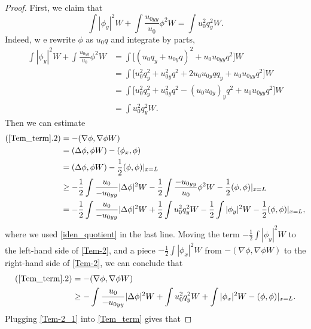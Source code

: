 \documentclass[reqno, 11pt]{amsart}
\theoremstyle{plain}
\theoremstyle{definition}
\theoremstyle{remark}
\numberwithin{equation}{section}
\begin{document}
\begin{proof}
First, we claim that
\begin{equation}\label{iden_quotient}
\int |\phi_y|^2 W + \int \frac{u_{0yy}}{u_0} \phi^2 W = \int u_0^2 q_y^2 W.
\end{equation}
Indeed, w e rewrite $\phi$ as $u_0 q$ and integrate by parts,
\begin{align*}
\int |\phi_y|^2 W + \int \frac{u_{0yy}}{u_0} \phi^2 W &= \int \Big[ (u_0 q_y + u_{0y}q)^2 + u_0 u_{0yy} q^2 \Big] W\\
&= \int \Big[ u_0^2 q_y^2 + u_{0y}^2q^2 + 2 u_0 u_{0y} q q_y + u_0 u_{0yy} q^2 \Big] W\\
&= \int \Big[ u_0^2 q_y^2 + u_{0y}^2q^2 - (u_0 u_{0y})_y q^2 + u_0 u_{0yy} q^2 \Big] W\\
&= \int u_0^2 q_y^2 W.
\end{align*}
Then we can estimate
\begin{equation}\label{Tem-2}
\begin{aligned}
 (\ref{Tem_term}.2) &= -  (\nabla \phi, \nabla \phi W) \\ &=  (\Delta \phi, \phi W)-  (\phi_x, \phi)\\
 &=  (\Delta \phi, \phi W) - \frac{1}{2} (\phi ,\phi)|_{x=L}\\
 & \ge - \frac{1}{2} \int \frac{u_0}{-u_{0yy}} |\Delta \phi|^2 W - \frac{1}{2} \int \frac{-u_{0yy}}{u_0} \phi^2 W - \frac{1}{2} (\phi ,\phi)|_{x=L}\\
 &= - \frac{1}{2} \int \frac{u_0}{-u_{0yy}} |\Delta \phi|^2 W + \frac{1}{2} \int u_0^2 q_y^2 W - \frac{1}{2} \int |\phi_y|^2 W - \frac{1}{2} (\phi ,\phi)|_{x=L},\\
\end{aligned}
\end{equation}
where we used \eqref{iden_quotient} in the last line. Moving the term $- \frac{1}{2} \int |\phi_y|^2 W$ to the left-hand side of \eqref{Tem-2}, and a piece $- \frac{1}{2} \int |\phi_x|^2 W$ from $-  (\nabla \phi, \nabla \phi W)$ to the right-hand side of \eqref{Tem-2}, we can conclude that
\begin{equation}\label{Tem-2_1}
\begin{aligned}
 (\ref{Tem_term}.2) &= -  (\nabla \phi, \nabla \phi W) \\
 & \ge - \int \frac{u_0}{-u_{0yy}} |\Delta \phi|^2 W + \int u_0^2 q_y^2 W +  \int |\phi_x|^2 W -  (\phi ,\phi)|_{x=L}.
\end{aligned}
\end{equation}
Plugging \eqref{Tem-2_1} into \eqref{Tem_term} gives that

\end{proof}
\end{document}
